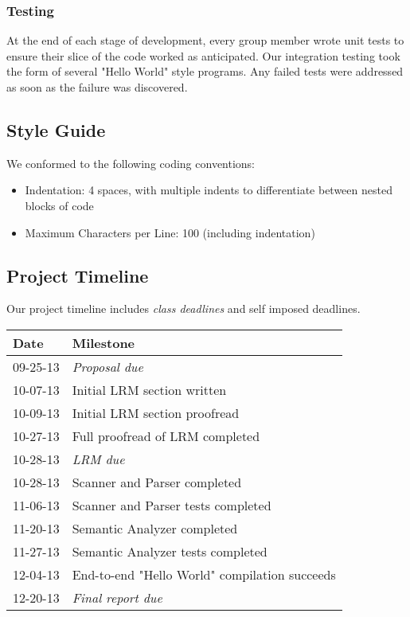 		\subsubsection{Testing}
		At the end of each stage of development, every group member wrote unit tests to ensure their slice of the code worked as anticipated. Our integration testing took the form of several "Hello World" style programs. Any failed tests were addressed as soon as the failure was discovered.
		
	\subsection{Style Guide}
	We conformed to the following coding conventions:
		\begin{itemize}
		\item Indentation: 4 spaces, with multiple indents to differentiate between nested blocks of code 
		\item Maximum Characters per Line: 100 (including indentation)
		\end{itemize}
	
	\subsection{Project Timeline}
	Our project timeline includes \emph{class deadlines} and self imposed deadlines.
		\begin{table}[htdp]
		\begin{tabular}{|l|l|}
		\hline
		Date & Milestone \\ \hline
		09-25-13 & \emph{Proposal due} \\
		10-07-13 & Initial LRM section written \\
		10-09-13 & Initial LRM section proofread \\
		10-27-13 & Full proofread of LRM  completed \\
		10-28-13 & \emph{LRM due} \\
		10-28-13 & Scanner and Parser completed  \\
		11-06-13 & Scanner and Parser tests completed \\
		11-20-13 & Semantic Analyzer completed \\
		11-27-13 & Semantic Analyzer tests completed \\
		12-04-13 & End-to-end "Hello World" compilation succeeds \\
		12-20-13& \emph{Final report due} \\ 
		\hline
		\end{tabular}
		\end{table}
		
